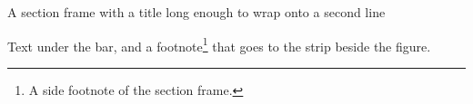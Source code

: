 \begin{sectionframe}{A section frame with a title long enough to wrap onto a second line}
	\begin{minipage}[t]{0.7\linewidth}\small
		Text under the bar, and a footnote\footnote{A side footnote of the section frame.} that goes to the strip beside the figure.
	\end{minipage}
\end{sectionframe}
